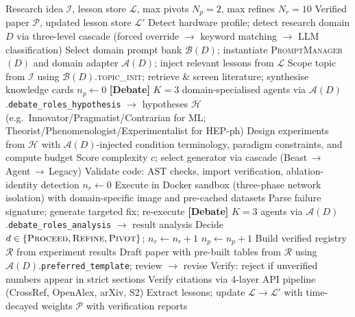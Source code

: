\documentclass{llmxive}
\providecommand{\system}{\textsc{AutoResearchClaw}}
\begin{document}
\begin{algorithm}[t]
\caption{\system{}: Autonomous Research Pipeline with Domain-Aware Routing}
\label{alg:pipeline}
\small
\begin{algorithmic}[1]
\REQUIRE Research idea $\mathcal{I}$, lesson store $\mathcal{L}$, max pivots $N_p{=}2$, max refines $N_r{=}10$
\ENSURE Verified paper $\mathcal{P}$, updated lesson store $\mathcal{L}'$
\STATE Detect hardware profile; detect research domain $D$ via three-level cascade
       (forced override $\to$ keyword matching $\to$ LLM classification)
\STATE Select domain prompt bank $\mathcal{B}(D)$; instantiate \textsc{PromptManager}$(D)$
       and domain adapter $\mathcal{A}(D)$; inject relevant lessons from $\mathcal{L}$
\STATE Scope topic from $\mathcal{I}$ using $\mathcal{B}(D)$.\textsc{topic\_init};
       retrieve \& screen literature; synthesise knowledge cards
\STATE $n_p \gets 0$
\REPEAT
    \STATE \textbf{[Debate]} $K{=}3$ domain-specialised agents via $\mathcal{A}(D)$.\texttt{debate\_roles\_hypothesis}
           $\to$ hypotheses $\mathcal{H}$ (e.g.\ Innovator/Pragmatist/Contrarian for ML;
           Theorist/Phenomenologist/Experimentalist for HEP-ph)
    \STATE Design experiments from $\mathcal{H}$ with $\mathcal{A}(D)$-injected condition
           terminology, paradigm constraints, and compute budget
    \STATE Score complexity $c$; select generator via cascade (Beast\,$\to$\,Agent\,$\to$\,Legacy)
    \STATE Validate code: AST checks, import verification, ablation-identity detection
    \STATE $n_r \gets 0$
    \REPEAT
        \STATE Execute in Docker sandbox (three-phase network isolation) with
               domain-specific image and pre-cached datasets
            \STATE Parse failure signature; generate targeted fix; re-execute
        \ENDWHILE
        \STATE \textbf{[Debate]} $K{=}3$ agents via $\mathcal{A}(D)$.\texttt{debate\_roles\_analysis}
               $\to$ result analysis
        \STATE Decide $d \in \{\textsc{Proceed}, \textsc{Refine}, \textsc{Pivot}\}$; $n_r \gets n_r + 1$
    \STATE $n_p \gets n_p + 1$
\STATE Build verified registry $\mathcal{R}$ from experiment results
\STATE Draft paper with pre-built tables from $\mathcal{R}$ using $\mathcal{A}(D)$.\texttt{preferred\_template};
       review $\to$ revise
\STATE Verify: reject if unverified numbers appear in strict sections
\STATE Verify citations via 4-layer API pipeline (CrossRef, OpenAlex, arXiv, S2)
\STATE Extract lessons; update $\mathcal{L} \to \mathcal{L}'$ with time-decayed weights
\RETURN $\mathcal{P}$ with verification reports
\end{algorithmic}
\end{algorithm}
\end{document}
